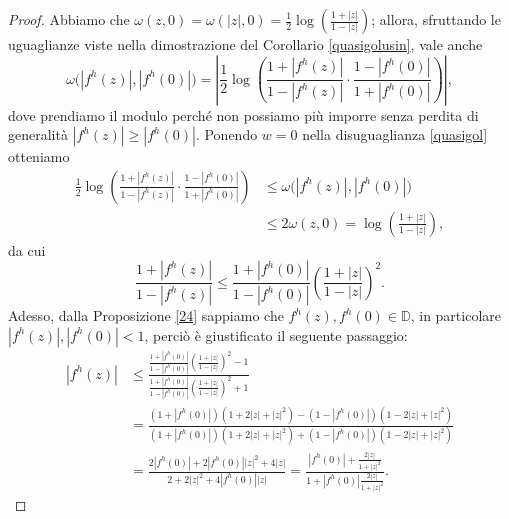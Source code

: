 \begin{proof}
  Abbiamo che $\omega(z, 0)=\omega(|z|,0)=\frac{1}{2}\log\left(\frac{1+|z|}{1-|z|}\right)$; allora, sfruttando le uguaglianze viste nella dimostrazione del Corollario \ref{quasigolusin}, vale anche
  $$\omega\bigl(|f^h(z)|,|f^h(0)|\bigr)=\left|\frac{1}{2}\log\left(\frac{1+|f^h(z)|}{1-|f^h(z)|}\cdot\frac{1-|f^h(0)|}{1+|f^h(0)|}\right)\right|,$$
  dove prendiamo il modulo perché non possiamo più imporre senza perdita di generalità $|f^h(z)| \ge |f^h(0)|$. Ponendo $w=0$ nella disuguaglianza \eqref{quasigol} otteniamo
  \begin{align*}
    \frac{1}{2}\log\left(\frac{1+|f^h(z)|}{1-|f^h(z)|}\cdot\frac{1-|f^h(0)|}{1+|f^h(0)|}\right) & \le \omega\bigl(|f^h(z)|,|f^h(0)|\bigr) \\
    & \le 2\omega(z,0)=\log\left(\frac{1+|z|}{1-|z|}\right),
  \end{align*}
  da cui
  \begin{equation}
    \frac{1+|f^h(z)|}{1-|f^h(z)|} \le \frac{1+|f^h(0)|}{1-|f^h(0)|}\left(\frac{1+|z|}{1-|z|}\right)^2. \label{golprimo}
  \end{equation}
  Adesso, dalla Proposizione \ref{24} sappiamo che $f^h(z),f^h(0) \in \mathbb{D}$, in particolare $|f^h(z)|,|f^h(0)|<1$, perciò è giustificato il seguente passaggio:
  \begin{align*}
    |f^h(z)| & \le \frac{\frac{1+|f^h(0)|}{1-|f^h(0)|}\left(\frac{1+|z|}{1-|z|}\right)^2-1}{\frac{1+|f^h(0)|}{1-|f^h(0)|}\left(\frac{1+|z|}{1-|z|}\right)^2+1} \\
    & =\frac{(1+|f^h(0)|)(1+2|z|+|z|^2)-(1-|f^h(0)|)(1-2|z|+|z|^2)}{(1+|f^h(0)|)(1+2|z|+|z|^2)+(1-|f^h(0)|)(1-2|z|+|z|^2)} \\
    & =\frac{2|f^h(0)|+2|f^h(0)||z|^2+4|z|}{2+2|z|^2+4|f^h(0)||z|}=\frac{|f^h(0)|+\frac{2|z|}{1+|z|^2}}{1+|f^h(0)|\frac{2|z|}{1+|z|^2}}.
  \end{align*}
\end{proof}
